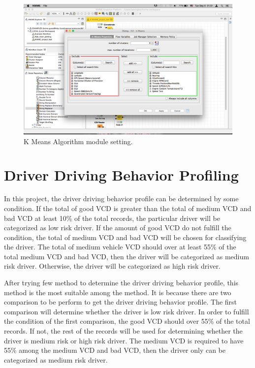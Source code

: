 \begin{figure}[hbt!]\centering
\includegraphics[width=.75\textwidth]{image/KNIMEkmean}
\caption{K Means Algorithm module setting.}
\label{fig:kmean}
\end{figure}



\section{Driver Driving Behavior Profiling}
In this project, the driver driving behavior profile can be determined by some condition. %
If the total of good VCD is greater than the total of medium VCD and bad VCD at least 10\% of the total records, the particular driver will be categorized as low risk driver. If the amount of good VCD do not fulfill the condition, the total of medium VCD and bad VCD will be chosen for classifying the driver. The total of medium vehicle VCD should over at least 55\% of the total medium VCD and bad VCD, then the driver will be categorized as medium risk driver. Otherwise, the driver will be categorized as high risk driver.

After trying few method to determine the driver driving behavior profile, this method is the most suitable among the method. It is because there are two comparison to be perform to get the driver driving behavior profile. The first comparison will determine whether the driver is low risk driver. In order to fulfill the condition of the first comparison, the good VCD should over 55\% of the total records. If not, the rest of the records will be used for determining whether the driver is medium risk or high risk driver. The medium VCD is required to have 55\% among the medium VCD and bad VCD, then the driver only can be categorized as medium risk driver.

